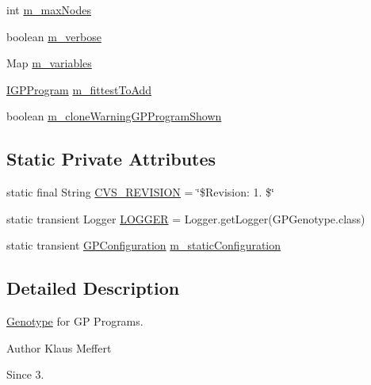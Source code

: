 \begin{DoxyCompactItemize}
\item 
int \hyperlink{classorg_1_1jgap_1_1gp_1_1impl_1_1_g_p_genotype_ab15e0e8d3ee0ba8c1e56727f2a2f32ed}{m\-\_\-max\-Nodes}
\item 
boolean \hyperlink{classorg_1_1jgap_1_1gp_1_1impl_1_1_g_p_genotype_ac5e56e43bba8e3368cacb3111a5fd60a}{m\-\_\-verbose}
\item 
Map \hyperlink{classorg_1_1jgap_1_1gp_1_1impl_1_1_g_p_genotype_a03d40b9502d5bbbe9855cef68c9c8123}{m\-\_\-variables}
\item 
\hyperlink{interfaceorg_1_1jgap_1_1gp_1_1_i_g_p_program}{I\-G\-P\-Program} \hyperlink{classorg_1_1jgap_1_1gp_1_1impl_1_1_g_p_genotype_af4a221f34692a5b47147dbbd31d26d23}{m\-\_\-fittest\-To\-Add}
\item 
boolean \hyperlink{classorg_1_1jgap_1_1gp_1_1impl_1_1_g_p_genotype_af0ec08e1f1fdf88d76bae2ba6d0fe986}{m\-\_\-clone\-Warning\-G\-P\-Program\-Shown}
\end{DoxyCompactItemize}
\subsection*{Static Private Attributes}
\begin{DoxyCompactItemize}
\item 
static final String \hyperlink{classorg_1_1jgap_1_1gp_1_1impl_1_1_g_p_genotype_ab88a16d04e096c2c2e1bfc4477ea7310}{C\-V\-S\-\_\-\-R\-E\-V\-I\-S\-I\-O\-N} = \char`\"{}\$Revision\-: 1. \$\char`\"{}
\item 
static transient Logger \hyperlink{classorg_1_1jgap_1_1gp_1_1impl_1_1_g_p_genotype_ada30eb741391730f266047d15cd40338}{L\-O\-G\-G\-E\-R} = Logger.\-get\-Logger(G\-P\-Genotype.\-class)
\item 
static transient \hyperlink{classorg_1_1jgap_1_1gp_1_1impl_1_1_g_p_configuration}{G\-P\-Configuration} \hyperlink{classorg_1_1jgap_1_1gp_1_1impl_1_1_g_p_genotype_a9e2b1a8103181690f4bb6e584463214c}{m\-\_\-static\-Configuration}
\end{DoxyCompactItemize}


\subsection{Detailed Description}
\hyperlink{classorg_1_1jgap_1_1_genotype}{Genotype} for G\-P Programs.

\begin{DoxyAuthor}{Author}
Klaus Meffert 
\end{DoxyAuthor}
\begin{DoxySince}{Since}
3. 
\end{DoxySince}


